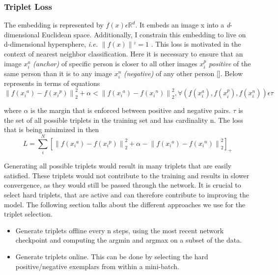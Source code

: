 \documentclass[a4paper,12pt, twoside]{NITKReport}
\begin{document}
\subsubsection{Triplet Loss}
\par The embedding is represented by $ f(x) \epsilon \mathbb{R}^{d}$. It embeds an image x into a \textit{d}-dimensional Euclidean space. Additionally, I constrain this embedding to live on d-dimensional hypersphere, \textit{i.e.} $\left \|f(x)  \right \|^{_{2}} =1$ . This loss is motivated in the context of nearest neighbor classification. Here it is necessary to ensure that an image $x_{i}^{a}$ \textit{(anchor)} of specific person is closer to all other images $x_{i}^{p}$ \textit{positive} of the same person than it is to any image $x_{i}^{n}$ \textit{(negative)} of any other person [\cite{schroff2015facenet}]. Below represents in terms of equations
\begin{equation}
\left \| f(x{_{i}}^{a})-f(x{_{i}}^{p})\right \|_{2}^{2} + \alpha < \left \| f(x{_{i}}^{a})-f(x{_{i}}^{n})\right \|_{2}^{2}, \forall (f(x_{i}^{a}),f(x_{i}^{p}),f(x_{i}^{n}))\epsilon \tau 
\end{equation}

where $\alpha$ is the margin that is enforced between positive and negative pairs.
$\tau$ is the set of all possible triplets in the training set and has cardinality n. The loss that is being minimized in then 
\begin{equation}
L = \sum_{i}^{N}[\left \| f(x{_{i}}^{a})-f(x{_{i}}^{p})\right \|_{2}^{2} + \alpha - \left \| f(x{_{i}}^{a})-f(x{_{i}}^{n})\right \|_{2}^{2}]_{+}
\end{equation}

Generating all possible triplets would result in many triplets that are easily satisfied. These triplets would not contribute to the training and results in slower convergence, as they would still be passed  through the network.  It is crucial to select hard triplets, that are active and can therefore contribute to improving the model.  The following section talks about the different approaches we use for the triplet selection.
\begin{itemize}
\item Generate triplets offline every n steps, using the most recent network checkpoint and computing the argmin and argmax on a subset of the data.
\item Generate triplets online.  This can be done by selecting the hard positive/negative exemplars from within a mini-batch.
\end{itemize}
\end{document}
